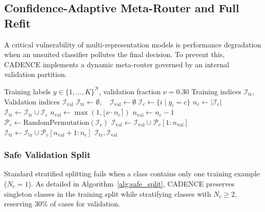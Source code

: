 \documentclass[journal,twocolumn]{article}
\begin{document}
\subsection{Confidence-Adaptive Meta-Router and Full Refit}
A critical vulnerability of multi-representation models is performance degradation when an unsuited classifier pollutes the final decision. To prevent this, CADENCE implements a dynamic meta-router governed by an internal validation partition.

\begin{algorithm}[t]
\caption{Internal Validation Split with Rare-Class Preservation}
\label{alg:safe_split}
\begin{algorithmic}[1]
\Require Training labels $y \in \{1,\dots,K\}^N$, validation fraction $\nu = 0.30$
\Ensure Training indices $\mathcal{I}_{\text{tr}}$, Validation indices $\mathcal{I}_{\text{val}}$
\State $\mathcal{I}_{\text{tr}} \leftarrow \emptyset, \quad \mathcal{I}_{\text{val}} \leftarrow \emptyset$
    \State $\mathcal{I}_c \leftarrow \{i \mid y_i = c\}$
    \State $n_c \leftarrow |\mathcal{I}_c|$
        \State $\mathcal{I}_{\text{tr}} \leftarrow \mathcal{I}_{\text{tr}} \cup \mathcal{I}_c$ 
    \Else
        \State $n_{\text{val}} \leftarrow \max(1, \lfloor \nu \cdot n_c \rceil)$
            \State $n_{\text{val}} \leftarrow n_c - 1$
        \EndIf
        \State $\mathcal{P}_c \leftarrow \text{RandomPermutation}(\mathcal{I}_c)$
        \State $\mathcal{I}_{\text{val}} \leftarrow \mathcal{I}_{\text{val}} \cup \mathcal{P}_c[1 : n_{\text{val}}]$
        \State $\mathcal{I}_{\text{tr}} \leftarrow \mathcal{I}_{\text{tr}} \cup \mathcal{P}_c[n_{\text{val}} + 1 : n_c]$
    \EndIf
\EndFor
\State \Return $\mathcal{I}_{\text{tr}}, \mathcal{I}_{\text{val}}$
\end{algorithmic}
\end{algorithm}

\subsubsection{Safe Validation Split}
Standard stratified splitting fails when a class contains only one training example ($N_c = 1$). As detailed in Algorithm~\ref{alg:safe_split}, CADENCE preserves singleton classes in the training split while stratifying classes with $N_c \ge 2$, reserving $30\%$ of cases for validation.
\end{document}
